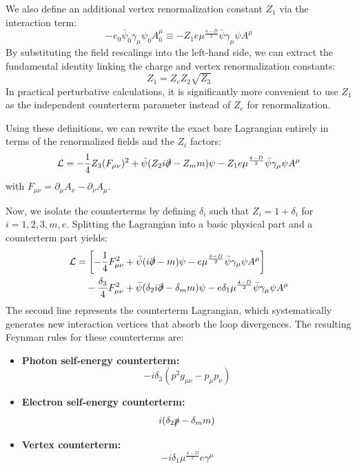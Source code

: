 We also define an additional vertex renormalization constant $Z_1$ via the interaction term:
\[ -e_0 \bar{\psi}_0 \gamma_\mu \psi_0 A_0^\mu \equiv -Z_1 e \mu^{\frac{4-D}{2}} \bar{\psi} \gamma_\mu \psi A^\mu \]
By substituting the field rescalings into the left-hand side, we can extract the fundamental identity linking the charge and vertex renormalization constants:
\[ Z_1 = Z_e Z_2 \sqrt{Z_3} \]
In practical perturbative calculations, it is significantly more convenient to use $Z_1$ as the independent counterterm parameter instead of $Z_e$ for renormalization.

Using these definitions, we can rewrite the exact bare Lagrangian entirely in terms of the renormalized fields and the $Z_i$ factors:
\[ \mathcal{L} = -\frac{1}{4}Z_3(F_{\mu\nu})^2 + \bar{\psi}(Z_2 i\slashed{\partial} - Z_m m)\psi - Z_1 e \mu^{\frac{4-D}{2}} \bar{\psi}\gamma_\mu\psi A^\mu \]
with $F_{\mu\nu} = \partial_\mu A_\nu - \partial_\nu A_\mu$.

Now, we isolate the counterterms by defining $\delta_i$ such that $Z_i = 1 + \delta_i$ for $i = 1, 2, 3, m, e$. Splitting the Lagrangian into a basic physical part and a counterterm part yields:
\[
    \begin{aligned}
        \mathcal{L} & = \left[ -\frac{1}{4}F_{\mu\nu}^2 + \bar{\psi}(i\slashed{\partial} - m)\psi - e \mu^{\frac{4-D}{2}} \bar{\psi}\gamma_\mu\psi A^\mu \right]                        \\
                    & \quad - \frac{\delta_3}{4}F_{\mu\nu}^2 + \bar{\psi}(\delta_2 i\slashed{\partial} - \delta_m m)\psi - e\delta_1 \mu^{\frac{4-D}{2}} \bar{\psi}\gamma_\mu\psi A^\mu
    \end{aligned}
\]
The second line represents the counterterm Lagrangian, which systematically generates new interaction vertices that absorb the loop divergences. The resulting Feynman rules for these counterterms are:
\begin{itemize}
    \item \textbf{Photon self-energy counterterm:}
          \[ -i\delta_3 (p^2 g_{\mu\nu} - p_\mu p_\nu) \]

    \item \textbf{Electron self-energy counterterm:}
          \[ i(\delta_2 \slashed{p} - \delta_m m) \]

    \item \textbf{Vertex counterterm:}
          \[ -i\delta_1 \mu^{\frac{4-D}{2}} e \gamma^\mu \]
\end{itemize}

